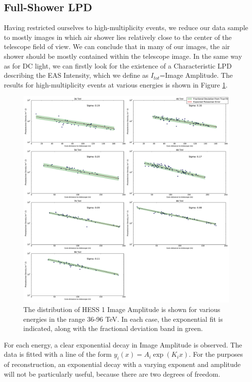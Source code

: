 \documentclass[11pt]{article}
\begin{document}
\subsection{Full-Shower LPD}
Having restricted ourselves to high-multiplicity events, we reduce our data sample to mostly images in which air shower lies relatively close to the center of the telescope field of view. We can conclude that in many of our images, the air shower should be mostly contained within the telescope image. In the same way as for DC light, we can firstly look for the existence of a Characteristic LPD describing the EAS Intensity, which we define as $I_{tot}$=Image Amplitude. The results for high-multiplicity events at various energies is shown in Figure \ref{fig:fullshowerlpd}.

\begin{figure}
\begin{center}
\includegraphics[width=\textwidth]{corsikafullshowerlpd}
\caption{The distribution of HESS 1 Image Amplitude is shown for various energies in the range 36-96 TeV. In each case, the exponential fit is indicated, along with the fractional deviation band in green.}
\label{fig:fullshowerlpd}
\end{center}
\end{figure}

For each energy, a clear exponential decay in Image Amplitude is observed. The data is fitted with a line of the form $y_{i} (x) =A_{i} \exp (K_{i} x)$. For the purposes of reconstruction, an exponential decay with a varying exponent and amplitude will not be particularly useful, because there are two degrees of freedom.
\end{document}
